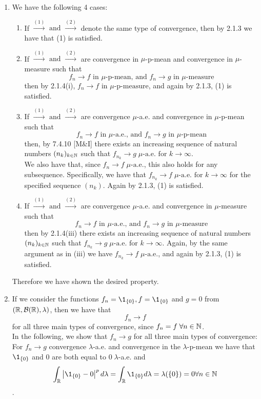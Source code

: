 \documentclass{Class}
\begin{document}
\begin{enumerate}
    \item We have the following 4 cases:
    \begin{enumerate}
        \item If $\stackrel{(1)}{\longrightarrow} \text{ and } \stackrel{(2)}{\longrightarrow}$ denote the same type of convergence, then by 2.1.3 we have that (1) is satisfied.
        \item If $\stackrel{(1)}{\longrightarrow} \text{ and } \stackrel{(2)}{\longrightarrow}$ are convergence in $\mu$-p-mean and convergence in $\mu$-measure such that 
        $$f_n \longrightarrow f \text{ in }\mu\text{-p-mean, and } f_n\longrightarrow g \text{ in }\mu\text{-measure}$$
        then by 2.1.4(i), 
        $f_n \longrightarrow f \text{ in }\mu\text{-p-measure}$, and again by 2.1.3, (1) is satisfied.
        \item If $\stackrel{(1)}{\longrightarrow} \text{ and } \stackrel{(2)}{\longrightarrow}$ are convergence $\mu$-a.e. and convergence in $\mu$-p-mean such that
         $$f_n \longrightarrow f \text{ in }\mu\text{-a.e., and } f_n\longrightarrow g \text{ in }\mu\text{-p-mean}$$
         then, by 7.4.10 [M\&I] there exists an increasing sequence of natural numbers $(n_k)_{k\in\mathbb{N}}$ such that $f_{n_k}\longrightarrow g \;\mu\text{-a.e. for }k\rightarrow \infty$.
         \\We also have that, since $f_n\longrightarrow f\; \mu\text{-a.e.}$, this also holds for any subsequence. Specifically, we have that $f_{n_k}\longrightarrow f \;\mu\text{-a.e. for }k\rightarrow \infty$ for the specified sequence $(n_k)$. Again by 2.1.3, (1) is satisfied.
        \item If $\stackrel{(1)}{\longrightarrow} \text{ and } \stackrel{(2)}{\longrightarrow}$ are convergence $\mu$-a.e. and convergence in $\mu$-measure such that
         $$f_n \longrightarrow f \text{ in }\mu\text{-a.e., and } f_n\longrightarrow g \text{ in }\mu\text{-measure}$$
         then by 2.1.4(iii) there exists an increasing sequence of natural numbers $(n_k)_{k\in\mathbb{N}}$ such that $f_{n_k}\longrightarrow g \;\mu\text{-a.e. for }k\rightarrow \infty$. Again, by the same argument as in (iii) we have $f_{n_k}\longrightarrow f \; \mu\text{-a.e.}$, and again by 2.1.3, (1) is satisfied. 
    \end{enumerate}
    Therefore we have shown the desired property.
    \item If we consider the functions $f_n=\1_{\{0\}}, f=\1_{\{0\}}$ and $g=0$ from $(\mathbb{R}, \mathcal{B}(\mathbb{R}),\lambda)$, then we have that $$f_n \rightarrow f$$ for all three main types of convergence, since $f_n=f \;\forall n \in \mathbb{N}$. \\In the following, we show that $f_n \rightarrow g$ for all three main types of convergence:
\\For $f_n \rightarrow g$ convergence $\lambda$-a.e. and convergence in the $\lambda$-p-mean we have that $\1_{\{0\}}$ and 0 are both equal to $0 \;\lambda$-a.e. and $$\int_{\mathbb{R}}\left|\1_{\{0\}}-0\right|^p d \lambda=\int_{\mathbb{R}} \1_{\{0\}} d \lambda=\lambda(\{0\})=0 \forall n \in \mathbb{N}$$.


\end{enumerate}
\end{document}
